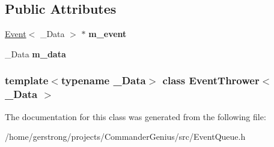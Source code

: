 \subsection*{Public Attributes}
\begin{DoxyCompactItemize}
\item 
\hypertarget{class_event_thrower_ace7d637b005d89079f67e74fb2826ccc}{
\hyperlink{class_event}{Event}$<$ \_\-Data $>$ $\ast$ {\bfseries m\_\-event}}
\label{class_event_thrower_ace7d637b005d89079f67e74fb2826ccc}

\item 
\hypertarget{class_event_thrower_a03117c2c9b12eae617b3c5d99b7826ac}{
\_\-Data {\bfseries m\_\-data}}
\label{class_event_thrower_a03117c2c9b12eae617b3c5d99b7826ac}

\end{DoxyCompactItemize}
\subsubsection*{template$<$typename \_\-Data$>$ class EventThrower$<$ \_\-Data $>$}



The documentation for this class was generated from the following file:\begin{DoxyCompactItemize}
\item 
/home/gerstrong/projects/CommanderGenius/src/EventQueue.h\end{DoxyCompactItemize}
